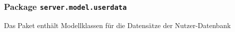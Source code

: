 \FloatBarrier
\subsubsection[Package server.model.userdata]{Package \texttt{server.model.userdata}}
Das Paket enthält Modellklassen für die Datensätze der Nutzer-Datenbank





       